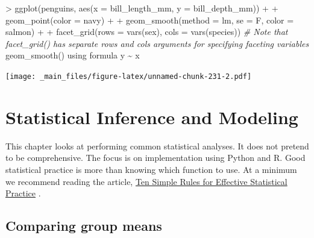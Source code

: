 \documentclass[
]{book}
\newenvironment{Shaded}{\begin{snugshade}}{\end{snugshade}}
\newcommand{\AttributeTok}[1]{\textcolor[rgb]{0.77,0.63,0.00}{#1}}
\newcommand{\CommentTok}[1]{\textcolor[rgb]{0.56,0.35,0.01}{\textit{#1}}}
\newcommand{\FunctionTok}[1]{\textcolor[rgb]{0.00,0.00,0.00}{#1}}
\newcommand{\NormalTok}[1]{#1}
\newcommand{\SpecialCharTok}[1]{\textcolor[rgb]{0.00,0.00,0.00}{#1}}
\newcommand{\StringTok}[1]{\textcolor[rgb]{0.31,0.60,0.02}{#1}}
\begin{document}
\begin{Shaded}
\begin{Highlighting}[]
\SpecialCharTok{\textgreater{}} \FunctionTok{ggplot}\NormalTok{(penguins, }\FunctionTok{aes}\NormalTok{(}\AttributeTok{x =}\NormalTok{ bill\_length\_mm, }\AttributeTok{y =}\NormalTok{ bill\_depth\_mm)) }\SpecialCharTok{+}
\SpecialCharTok{+}   \FunctionTok{geom\_point}\NormalTok{(}\AttributeTok{color =} \StringTok{\textquotesingle{}navy\textquotesingle{}}\NormalTok{) }\SpecialCharTok{+}
\SpecialCharTok{+}   \FunctionTok{geom\_smooth}\NormalTok{(}\AttributeTok{method =} \StringTok{\textquotesingle{}lm\textquotesingle{}}\NormalTok{, }\AttributeTok{se =}\NormalTok{ F, }\AttributeTok{color =} \StringTok{\textquotesingle{}salmon\textquotesingle{}}\NormalTok{) }\SpecialCharTok{+}
\SpecialCharTok{+}   \FunctionTok{facet\_grid}\NormalTok{(}\AttributeTok{rows =} \FunctionTok{vars}\NormalTok{(sex), }\AttributeTok{cols =} \FunctionTok{vars}\NormalTok{(species)) }\CommentTok{\# Note that facet\_grid() has separate \textasciigrave{}rows\textasciigrave{} and \textasciigrave{}cols\textasciigrave{} arguments for specifying faceting variables}
\StringTok{\textasciigrave{}}\AttributeTok{geom\_smooth()}\StringTok{\textasciigrave{}}\NormalTok{ using formula }\StringTok{\textquotesingle{}y \textasciitilde{} x\textquotesingle{}}
\end{Highlighting}
\end{Shaded}

\texttt{[image: \_main\_files/figure-latex/unnamed-chunk-231-2.pdf]}

\hypertarget{statistical-inference-and-modeling}{%
\chapter{Statistical Inference and Modeling}\label{statistical-inference-and-modeling}}

This chapter looks at performing common statistical analyses. It does not pretend to be comprehensive. The focus is on implementation using Python and R. Good statistical practice is more than knowing which function to use. At a minimum we recommend reading the article, \href{https://journals.plos.org/ploscompbiol/article?id=10.1371/journal.pcbi.1004961}{Ten Simple Rules for Effective Statistical Practice} \citep{kass_caffo_davidian_meng_yu_reid_2016}.

\hypertarget{comparing-group-means}{%
\section{Comparing group means}\label{comparing-group-means}}
\end{document}
